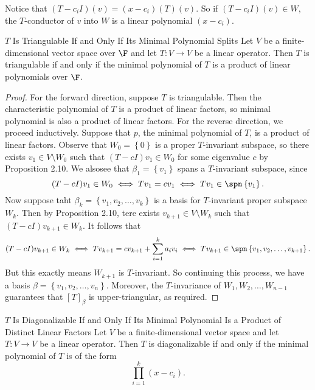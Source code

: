 \documentclass[linearalgebraII]{subfiles}
\begin{document}
    \begin{remark}
        Notice that $(T-c_iI)(v) = (x-c_i)(T)(v)$. So if $(T-c_iI)(v)\in W$, the $T$-conductor of $v$ into $W$ is a linear polynomial $(x-c_i)$.
    \end{remark}

    \begin{theorem}{$T$ Is Triangulable If and Only If Its Minimal Polynomial Splits}
        Let $V$ be a finite-dimensional vector space over $\F$ and let $T:V\to V$ be a linear operator. Then $T$ is triangulable if and only if the minimal polynomial of $T$ is a product of linear polynomials over $\F$.
    \end{theorem}

    \begin{proof}
        For the forward direction, suppose $T$ is triangulable. Then the characteristic polynomial of $T$ is a product of linear factors, so minimal polynomial is also a product of linear factors. For the reverse direction, we proceed inductively. Suppose that $p$, the minimal polynomial of $T$, is a product of linear factors. Observe that $W_0 = \left\lbrace 0 \right\rbrace$ is a proper $T$-invariant subspace, so there exists $v_1\in V\setminus W_0$ such that $(T-cI)v_1\in W_0$ for some eigenvalue $c$ by Proposition 2.10. We alsosee that $\beta_1 = \left\lbrace v_1 \right\rbrace$ spans a $T$-invariant subspace, since
        \begin{equation*}
            (T-cI)v_1\in W_0 \iff Tv_1 = cv_1 \iff Tv_1\in \spn \left\lbrace v_1 \right\rbrace.
        \end{equation*}
        Now suppose taht $\beta_k = \left\lbrace v_1, v_2, \ldots, v_k \right\rbrace$ is a basis for $T$-invariant proper subspace $W_k$. Then by Proposition 2.10, tere exists $v_{k+1}\in V\setminus W_k$ such that $(T-cI)v_{k+1}\in W_k$. It follows that
        \begin{equation*}
            (T-cI)v_{k+1}\in W_k \iff Tv_{k+1} = cv_{k+1} + \sum^{k}_{i=1} a_iv_i  \iff Tv_{k+1}\in \spn \left\lbrace v_1, v_2, \ldots, v_{k+1} \right\rbrace.
        \end{equation*}
        But this exactly means $W_{k+1}$ is $T$-invariant. So continuing this process, we have a basis $\beta = \left\lbrace v_1, v_2, \ldots, v_n \right\rbrace$. Moreover, the $T$-invariance of $W_1, W_2, \ldots, W_{n-1}$ guarantees that $[T]_\beta$ is upper-triangular, as required.
    \end{proof}

    \clearpage
    \begin{theorem}{$T$ Is Diagonalizable If and Only If Its Minimal Polynomial Is a Product of Distinct Linear Factors}
        Let $V$ be a finite-dimensional vector space and let $T:V\to V$ be a linear operator. Then $T$ is diagonalizable if and only if the minimal polynomial of $T$ is of the form
        \begin{equation*}
            \prod^{k}_{i=1} (x-c_i).
        \end{equation*}
    \end{theorem}
\end{document}
